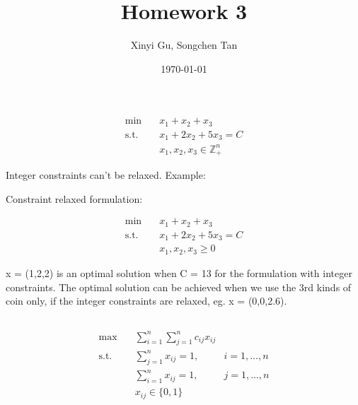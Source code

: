 \documentclass{article}
\title{Homework 3}
\author{Xinyi Gu, Songchen Tan}
\date{\today}
\newcommand{\1}{\bm 1}
\begin{document}
\maketitle
\section{}


\section{}





\section{}


\section{}
\subsection{}
\begin{align*}
    \min \quad & x_1 + x_2 + x_3  \\
    \text{s.t.} \quad & x_1 + 2x_2+5x_3 = C \\
    & x_1, x_2, x_3 \in \mathbb{Z}^{n}_+
\end{align*}

Integer constraints can't be relaxed. Example:

Constraint relaxed formulation:

\begin{align*}
    \min \quad & x_1 + x_2 + x_3  \\
    \text{s.t.} \quad & x_1 + 2x_2+5x_3 = C \\
    & x_1, x_2, x_3 \geq 0
\end{align*}

x = (1,2,2) is an optimal solution when C = 13 for the formulation with integer constraints. The optimal solution can be achieved when we use the 3rd kinds of coin only, if the integer constraints are relaxed, eg. x = (0,0,2.6).

\subsection{}
\begin{align*}
    \max \quad & \sum^{n}_{i=1}\sum^{n}_{j=1} c_{ij}x_{ij}   \\
    \text{s.t.} \quad & \sum^{n}_{j=1} x_{ij} = 1, & i = 1, ..., n \\
    & \sum^{n}_{i=1} x_{ij} = 1, & j = 1, ..., n\\
    & x_{ij} \in \{0, 1\}
\end{align*}
\end{document}
